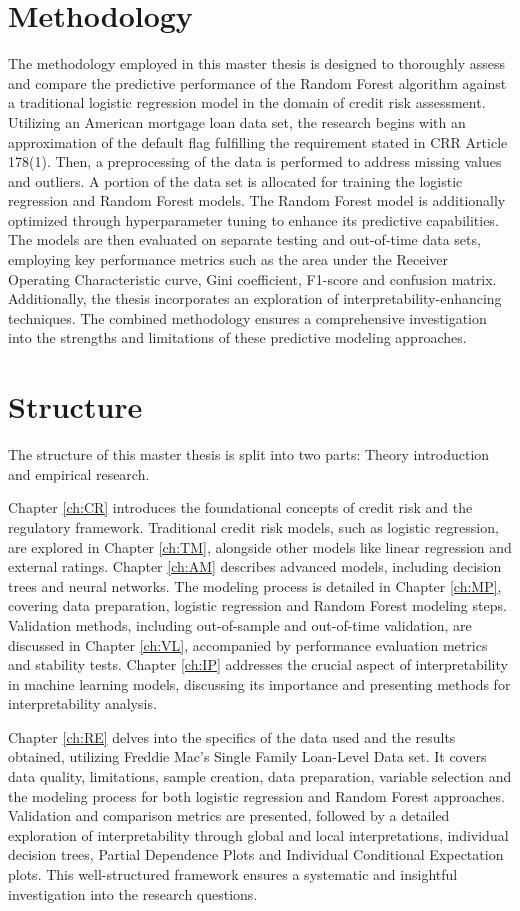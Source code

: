 \section{Methodology}

The methodology employed in this master thesis is designed to thoroughly assess and compare the predictive performance of the Random Forest algorithm against a traditional logistic regression model in the domain of credit risk assessment. Utilizing an American mortgage loan data set, the research begins with an approximation of the default flag fulfilling the requirement stated in \ac{CRR} Article 178(1). Then, a preprocessing of the data is performed to address missing values and outliers. A portion of the data set is allocated for training the logistic regression and Random Forest models. The Random Forest model is additionally optimized through hyperparameter tuning to enhance its predictive capabilities. The models are then evaluated on separate testing and out-of-time data sets, employing key performance metrics such as the area under the Receiver Operating Characteristic curve, Gini coefficient, F1-score and confusion matrix. Additionally, the thesis incorporates an exploration of interpretability-enhancing techniques. The combined methodology ensures a comprehensive investigation into the strengths and limitations of these predictive modeling approaches.

\section{Structure}

The structure of this master thesis is split into two parts: Theory introduction and empirical research. 

Chapter \ref{ch:CR} introduces the foundational concepts of credit risk and the regulatory framework. Traditional credit risk models, such as logistic regression, are explored in Chapter \ref{ch:TM}, alongside other models like linear regression and external ratings. Chapter \ref{ch:AM} describes advanced models, including decision trees and neural networks. The modeling process is detailed in Chapter \ref{ch:MP}, covering data preparation, logistic regression and Random Forest modeling steps. Validation methods, including out-of-sample and out-of-time validation, are discussed in Chapter \ref{ch:VL}, accompanied by performance evaluation metrics and stability tests. Chapter \ref{ch:IP} addresses the crucial aspect of interpretability in machine learning models, discussing its importance and presenting methods for interpretability analysis. 

Chapter \ref{ch:RE} delves into the specifics of the data used and the results obtained, utilizing Freddie Mac's Single Family Loan-Level Data set. It covers data quality, limitations, sample creation, data preparation, variable selection and the modeling process for both logistic regression and Random Forest approaches. Validation and comparison metrics are presented, followed by a detailed exploration of interpretability through global and local interpretations, individual decision trees, Partial Dependence Plots and Individual Conditional Expectation plots. 
This well-structured framework ensures a systematic and insightful investigation into the research questions.